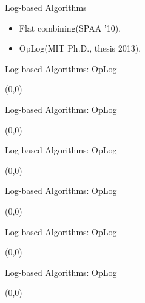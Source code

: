 \documentclass[english]{beamer} %
\begin{document}
\begin{frame}{Log-based Algorithms}
    \begin{itemize}[<+-| alert@+>]
    \item Flat combining(SPAA '10).
    \item OpLog(MIT Ph.D., thesis 2013). 
    \end{itemize}
\end{frame}



\begin{frame}{Log-based Algorithms: OpLog}
\begin{textblock}{1}(0,0)
\end{textblock}
\end{frame}


\begin{frame}{Log-based Algorithms: OpLog}
\begin{textblock}{1}(0,0)
\end{textblock}
\end{frame}



\begin{frame}{Log-based Algorithms: OpLog}
\begin{textblock}{1}(0,0)
\end{textblock}
\end{frame}


\begin{frame}{Log-based Algorithms: OpLog}
\begin{textblock}{1}(0,0)
\end{textblock}
\end{frame}


\begin{frame}{Log-based Algorithms: OpLog}
\begin{textblock}{1}(0,0)
\end{textblock}
\end{frame}

\begin{frame}{Log-based Algorithms: OpLog}
\begin{textblock}{1}(0,0)
\end{textblock}
\end{frame}
\end{document}
